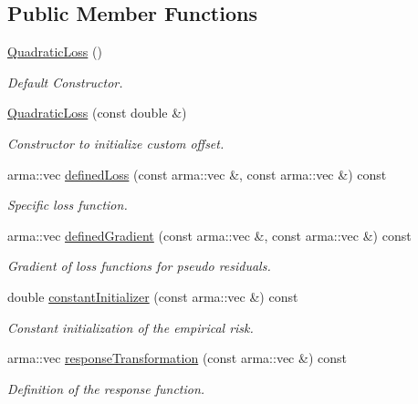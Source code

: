 \subsection*{Public Member Functions}
\begin{DoxyCompactItemize}
\item 
\hyperlink{classloss_1_1_quadratic_loss_acf4a3be5ab3c3aa4d574748c8864bacd}{Quadratic\+Loss} ()
\begin{DoxyCompactList}\small\item\em Default Constructor. \end{DoxyCompactList}\item 
\hyperlink{classloss_1_1_quadratic_loss_a41fd44734dc6d4f4189e02c79bcf4095}{Quadratic\+Loss} (const double \&)
\begin{DoxyCompactList}\small\item\em Constructor to initialize custom offset. \end{DoxyCompactList}\item 
arma\+::vec \hyperlink{classloss_1_1_quadratic_loss_ae34f68243ffe021e309ed73a68796e1e}{defined\+Loss} (const arma\+::vec \&, const arma\+::vec \&) const
\begin{DoxyCompactList}\small\item\em Specific loss function. \end{DoxyCompactList}\item 
arma\+::vec \hyperlink{classloss_1_1_quadratic_loss_adb4da1acbad702b5ba8570abaa17d373}{defined\+Gradient} (const arma\+::vec \&, const arma\+::vec \&) const
\begin{DoxyCompactList}\small\item\em Gradient of loss functions for pseudo residuals. \end{DoxyCompactList}\item 
double \hyperlink{classloss_1_1_quadratic_loss_a43989f3fbecc27351513afe1136cdf38}{constant\+Initializer} (const arma\+::vec \&) const
\begin{DoxyCompactList}\small\item\em Constant initialization of the empirical risk. \end{DoxyCompactList}\item 
arma\+::vec \hyperlink{classloss_1_1_quadratic_loss_a0a7f1ed4a208326bed1ba5f1bb4d37e5}{response\+Transformation} (const arma\+::vec \&) const
\begin{DoxyCompactList}\small\item\em Definition of the response function. \end{DoxyCompactList}\end{DoxyCompactItemize}
